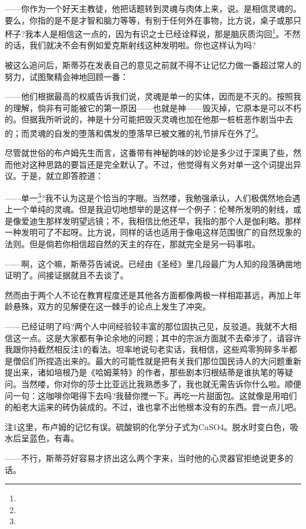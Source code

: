 \par ——你作为一个好天主教徒，他把话题转到灵魂与肉体上来，说。是相信灵魂的。要么，你指的是不是才智和脑力等等，有别于任何外在事物，比方说，桌子或那只杯子?我本人是相信这一点的，因为有识之士已经诠释说，那是脑灰质沟回\footnote{}。不然的话，我们就决不会有例如爱克斯射线这种发明啦。你也这样认为吗?
\par 被这么追问后，斯蒂芬在发表自己的意见之前就不得不让记忆力做一番超过常人的努力，试图聚精会神地回顾一番：
\par ——他们根据最高的权威告诉我们说，灵魂是单一的实体，因而是不灭的。按照我的理解，倘非有可能被它的第一原因——也就是神——毁灭掉，它原本是可以不朽的。但据我所听说的，神是十分可能把毁灭灵魂也加在他那一桩桩恶作剧当中去的；而灵魂的自发的堕落和偶发的堕落早已被文雅的礼节排斥在外了\footnote{}。
\par 尽管就世俗的布卢姆先生而言，这番带有神秘韵味的妙论是多少过于深奥了些，然而他对这种思路的要旨还是完全默认了。不过，他觉得有义务对单一这个词提出异议。于是，就立即答腔道：
\par ——单一\footnote{}?我不认为这是个恰当的字眼。当然喽，我勉强承认，人们极偶然地会遇上一个单纯的灵魂。但是我迫切地想举的是这样一个例子：伦琴所发明的射线，或是像爱迪生那样发明望远镜；不，我相信比他还早，我指的那个人是伽利略。那样一种发明可了不起呀。比方说，同样的话也适用于像电这样范围很广的自然现象的法则。但是倘若你相信超自然的天主的存在，那就完全是另一码事啦。
\par ——啊，这个嘛，斯蒂芬告诫说。已经由《圣经》里几段最广为人知的段落确凿地证明了。间接证据就且不去谈了。
\par 然而由于两个人不论在教育程度还是其他各方面都像两极一样相距甚远，再加上年龄悬殊，双方的见解便在这一棘手的论点上发生了冲突。
\par ——已经证明了吗?两个人中间经验较丰富的那位固执己见，反驳道。我就不大相信这一点。这是大家都有争论余地的问题；其中的宗派方面就不去牵涉了，请容许我跟你持截然相反注1的看法。坦率地说句老实话，我相信，这些鸡零狗碎多半都是僧侣们所捏造出来的。最大的可能性就是把有关我们那位国民诗人的大问题重新提出来，诸如培根乃是《哈姆莱特》的作者，那些剧本归根结蒂是谁执笔的等疑问。当然喽，你对你的莎士比亚远比我熟悉多了，我也就无需告诉你什么啦。顺便问一句：这咖啡你喝得下去吗?我替你搅一下。再吃一片甜面包。这就像是用咱们的船老大运来的砖伪装成的。不过，谁也拿不出他根本没有的东西。尝一点儿吧。
\par 注1这里，布卢姆的记忆有误。硫酸铜的化学分子式为CuSO4。脱水时变白色，吸水后呈蓝色，有毒。
\par ——不行，斯蒂芬好容易才挤出这么两个字来，当时他的心灵器官拒绝说更多的话。
